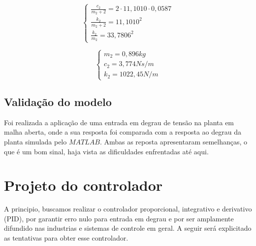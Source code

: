 \documentclass{ifacconf}
\begin{document}
\begin{equation}
  \left\{
\begin{array}{lr}
  \frac{c_2}{m_2 + 2} = 2 \cdot 11,1010 \cdot 0,0587 \\
  \frac{k_2}{m_2 + 2} = 11,1010^2 \\
  \frac{k_2}{m_2} = 33,7806^2
\end{array}
\right.
\end{equation}

\begin{equation}
  \left\{
\begin{array}{lr}
  m_2 = 0,896 kg \\
  c_2 = 3,774 Ns/m \\
  k_2 = 1022,45 N/m
\end{array}
\right.
\end{equation}

\subsection{Validação do modelo}

Foi realizada a aplicação de uma entrada em degrau de tensão na planta em malha aberta, onde a sua resposta
foi comparada com a resposta ao degrau da planta simulada pelo $MATLAB$. Ambas as reposta apresentaram semelhanças,
o que é um bom sinal, haja vista as dificuldades enfrentadas até aqui.

\section{Projeto do controlador}

A principio, buscamos realizar o controlador proporcional, integrativo e derivativo (PID), 
por garantir erro nulo para entrada em degrau e por ser amplamente difundido nas industrias
e sistemas de controle em geral. A seguir será explicitado as tentativas para obter esse controlador.
\end{document}
